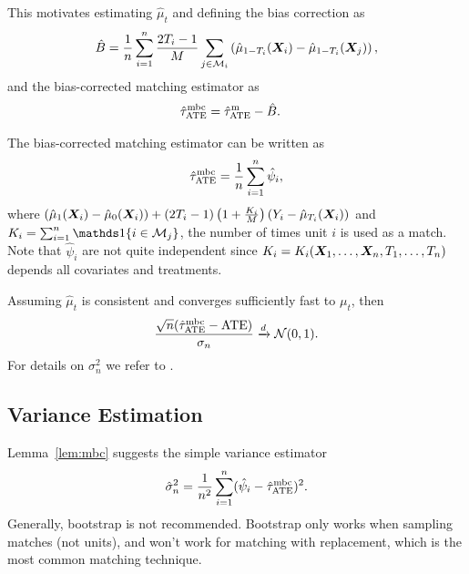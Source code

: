 \documentclass[11pt]{exam}
\begin{document}
This motivates estimating $\hat \mu_t$ and defining the bias correction as
\[
    \hat B = \frac{1}{n} \sum_{i=1}^n \frac{2T_i - 1}{M} \sum_{j \in \mathcal{M}_i} \left(\hat \mu_{1- T_i}(\bm{X}_i) - \hat \mu_{1- T_i}(\bm{X}_j)\right),
\]
and the bias-corrected matching estimator as
\begin{align*}
    \hat \tau^\mathrm{mbc}_{\mathrm{ATE}} &= \hat \tau^\mathrm{m}_{\mathrm{ATE}} - \hat B.
\end{align*}

\begin{lemma}\label{lem:mbc}
    The bias-corrected matching estimator can be written as
    \[
    \hat \tau^\mathrm{mbc}_{\mathrm{ATE}} = \frac{1}{n} \sum_{i = 1}^n \hat \psi_i,
    \]
    where $(\hat \mu_{1}(\bm{X}_i) - \hat \mu_{0}(\bm{X}_i)) + (2T_i - 1) \left(1 + \frac{K_i}{M}\right) (Y_i - \hat \mu_{T_i}(\bm{X}_i))$ and $K_i = \sum_{i=1}^n\indicator{i \in \mathcal{M}_j}$, the number of times unit $i$ is used as a match. Note that $\hat \psi_i$ are not quite independent since $K_i = K_i(\bm{X}_1, \ldots, \bm{X}_n, T_1, \ldots, T_n)$ depends all covariates and treatments.
\end{lemma}

\begin{theorem}
    Assuming $\hat \mu_t$ is consistent and converges sufficiently fast to $\mu_t$, then 
    \[
    \frac{\sqrt{n}(\hat \tau^\mathrm{mbc}_{\mathrm{ATE}} - \mathrm{ATE})}{\sigma_n} \xrightarrow{d} \mathcal{N}(0, 1).
    \]
    For details on $\sigma^2_n$ we refer to \citet{abadie2011bias}.
\end{theorem}

\subsection{Variance Estimation}
Lemma~\ref{lem:mbc} suggests the simple variance estimator \citep[Chapter~15.3]{ding2023coursecausalinference}
\[
 \hat{\sigma}_n^2 = \frac{1}{n^2} \sum_{i=1}^n (\hat \psi_i - \hat \tau^\mathrm{mbc}_{\mathrm{ATE}})^2.
\]
Generally, bootstrap is not recommended. Bootstrap only works when sampling matches (not units), and won't work for matching with replacement, which is the most common matching technique.

\endgroup

\newpage


\end{document}
